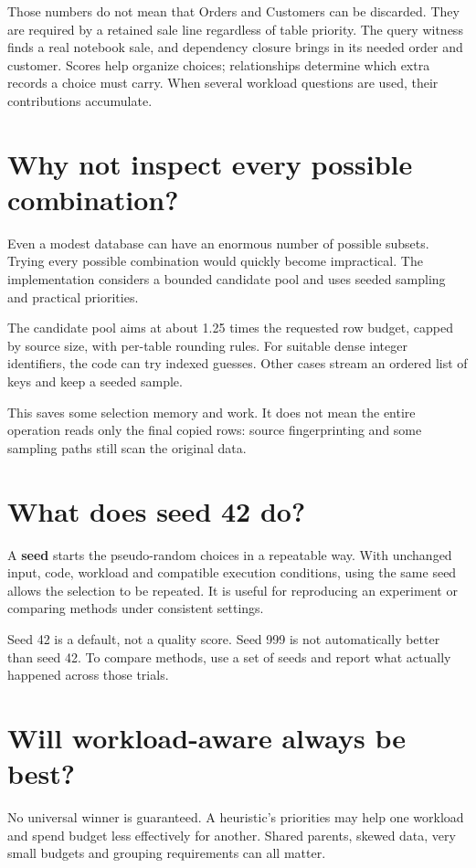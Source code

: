 \documentclass[12pt,a4paper,oneside]{report}
\begin{document}
Those numbers do not mean that Orders and Customers can be discarded. They are required by a retained sale line regardless of table priority. The query witness finds a real notebook sale, and dependency closure brings in its needed order and customer. Scores help organize choices; relationships determine which extra records a choice must carry. When several workload questions are used, their contributions accumulate.

\section{Why not inspect every possible combination?}
Even a modest database can have an enormous number of possible subsets. Trying every possible combination would quickly become impractical. The implementation considers a bounded candidate pool and uses seeded sampling and practical priorities.

The candidate pool aims at about 1.25 times the requested row budget, capped by source size, with per-table rounding rules. For suitable dense integer identifiers, the code can try indexed guesses. Other cases stream an ordered list of keys and keep a seeded sample.

This saves some selection memory and work. It does not mean the entire operation reads only the final copied rows: source fingerprinting and some sampling paths still scan the original data.

\section{What does seed 42 do?}
A \textbf{seed} starts the pseudo-random choices in a repeatable way. With unchanged input, code, workload and compatible execution conditions, using the same seed allows the selection to be repeated. It is useful for reproducing an experiment or comparing methods under consistent settings.

Seed 42 is a default, not a quality score. Seed 999 is not automatically better than seed 42. To compare methods, use a set of seeds and report what actually happened across those trials.

\section{Will workload-aware always be best?}
No universal winner is guaranteed. A heuristic's priorities may help one workload and spend budget less effectively for another. Shared parents, skewed data, very small budgets and grouping requirements can all matter.
\end{document}

